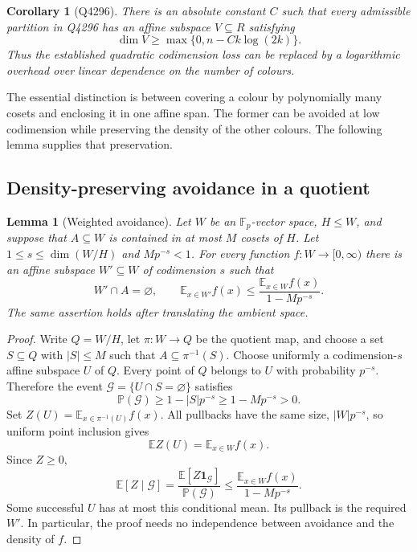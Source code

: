 \documentclass[11pt]{article}
\newtheorem{lemma}[theorem]{Lemma}
\newtheorem{corollary}[theorem]{Corollary}
\theoremstyle{remark}
\newcommand{\Fp}{\mathbb F_p}
\newcommand{\E}{\mathbb E}
\newcommand{\Prob}{\mathbb P}
\newcommand{\ind}{\mathbf 1}
\begin{document}
\begin{corollary}[Q4296]\label{cor:q4296}
There is an absolute constant $C$ such that every admissible partition in
Q4296 has an affine subspace $V\subseteq R$ satisfying
\[
 \dim V\geq \max\{0,n-Ck\log(2k)\}.
\]
Thus the established quadratic codimension loss can be replaced by a
logarithmic overhead over linear dependence on the number of colours.
\end{corollary}

The essential distinction is between covering a colour by polynomially
many cosets and enclosing it in one affine span. The former can be avoided
at low codimension while preserving the density of the other colours.
The following lemma supplies that preservation.

\subsection{Density-preserving avoidance in a quotient}

\begin{lemma}[Weighted avoidance]\label{lem:avoidance}
Let $W$ be an $\Fp$-vector space, $H\leq W$, and suppose that $A\subseteq W$
is contained in at most $M$ cosets of $H$. Let
$1\leq s\leq\dim(W/H)$ and $Mp^{-s}<1$. For every function
$f:W\longrightarrow[0,\infty)$ there is an affine subspace $W'\subseteq W$
of codimension $s$ such that
\begin{equation}\label{eq:avoidance}
 W'\cap A=\varnothing,\qquad
 \E_{x\in W'}f(x)\leq
 \frac{\E_{x\in W}f(x)}{1-Mp^{-s}}.
\end{equation}
The same assertion holds after translating the ambient space.
\end{lemma}

\begin{proof}
Write $Q=W/H$, let $\pi:W\to Q$ be the quotient map, and choose a set
$S\subseteq Q$ with $|S|\leq M$ such that $A\subseteq\pi^{-1}(S)$.
Choose uniformly a codimension-$s$ affine subspace $U$ of $Q$.
Every point of $Q$ belongs to $U$ with probability $p^{-s}$.
Therefore the event $\mathcal G=\{U\cap S=\varnothing\}$ satisfies
\[
 \Prob(\mathcal G)\geq1-|S|p^{-s}\geq1-Mp^{-s}>0.
\]
Set $Z(U)=\E_{x\in\pi^{-1}(U)}f(x)$. All pullbacks have the same size,
$|W|p^{-s}$, so uniform point inclusion gives
\[
 \E Z(U)=\E_{x\in W}f(x).
\]
Since $Z\geq0$,
\[
 \E[Z\mid\mathcal G]
 =\frac{\E[Z\ind_{\mathcal G}]}{\Prob(\mathcal G)}
 \leq\frac{\E_{x\in W}f(x)}{1-Mp^{-s}}.
\]
Some successful $U$ has at most this conditional mean. Its pullback is the
required $W'$. In particular, the proof needs no independence between
avoidance and the density of $f$.
\end{proof}
\end{document}
